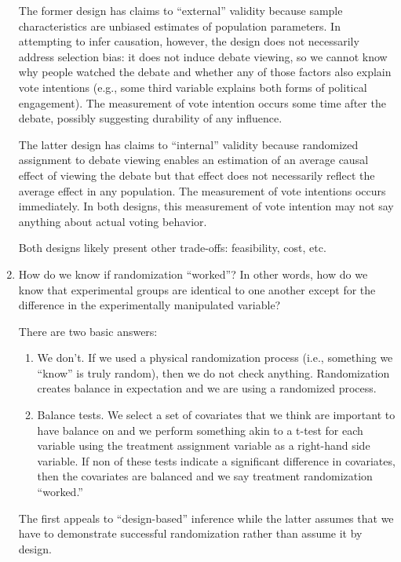 \documentclass[a4paper]{exam}
\begin{document}
\begin{enumerate}
\begin{solution}
The former design has claims to ``external'' validity because sample characteristics are unbiased estimates of population parameters. In attempting to infer causation, however, the design does not necessarily address selection bias: it does not induce debate viewing, so we cannot know why people watched the debate and whether any of those factors also explain vote intentions (e.g., some third variable explains both forms of political engagement). The measurement of vote intention occurs some time after the debate, possibly suggesting durability of any influence.

The latter design has claims to ``internal'' validity because randomized assignment to debate viewing enables an estimation of an average causal effect of viewing the debate but that effect does not necessarily reflect the average effect in any population. The measurement of vote intentions occurs immediately. In both designs, this measurement of vote intention may not say anything about actual voting behavior.

Both designs likely present other trade-offs: feasibility, cost, etc.

\end{solution}

\item How do we know if randomization ``worked''? In other words, how do we  know that experimental groups are identical to one another except for the difference in the experimentally manipulated variable?

\begin{solution}
There are two basic answers:

\begin{enumerate}
\item We don't. If we used a physical randomization process (i.e., something we ``know'' is truly random), then we do not check anything. Randomization creates balance in expectation and we are using a randomized process.
\item Balance tests. We select a set of covariates that we think are important to have balance on and we perform something akin to a t-test for each variable using the treatment assignment variable as a right-hand side variable. If non of these tests indicate a significant difference in covariates, then the covariates are balanced and we say treatment randomization ``worked.''
\end{enumerate}

The first appeals to ``design-based'' inference while the latter assumes that we have to demonstrate successful randomization rather than assume it by design.


\end{solution}
\end{enumerate}
\end{document}
